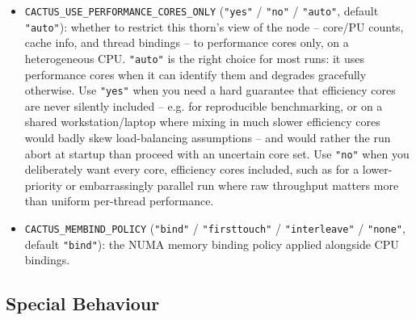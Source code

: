 \begin{itemize}
\item \texttt{CACTUS\_USE\_PERFORMANCE\_CORES\_ONLY} (\texttt{"yes"} /
  \texttt{"no"} / \texttt{"auto"}, default \texttt{"auto"}): whether to
  restrict this thorn's view of the node -- core/PU counts, cache
  info, and thread bindings -- to performance cores only, on a
  heterogeneous CPU. \texttt{"auto"} is the right choice for most runs:
  it uses performance cores when it can identify them and degrades
  gracefully otherwise. Use \texttt{"yes"} when you need a hard
  guarantee that efficiency cores are never silently included -- e.g.
  for reproducible benchmarking, or on a shared workstation/laptop
  where mixing in much slower efficiency cores would badly skew
  load-balancing assumptions -- and would rather the run abort at
  startup than proceed with an uncertain core set. Use \texttt{"no"}
  when you deliberately want every core, efficiency cores included,
  such as for a lower-priority or embarrassingly parallel run where
  raw throughput matters more than uniform per-thread performance.
\item \texttt{CACTUS\_MEMBIND\_POLICY} (\texttt{"bind"} /
  \texttt{"firsttouch"} / \texttt{"interleave"} / \texttt{"none"},
  default \texttt{"bind"}): the NUMA memory binding policy applied
  alongside CPU bindings.
\end{itemize}

\subsection{Special Behaviour}

